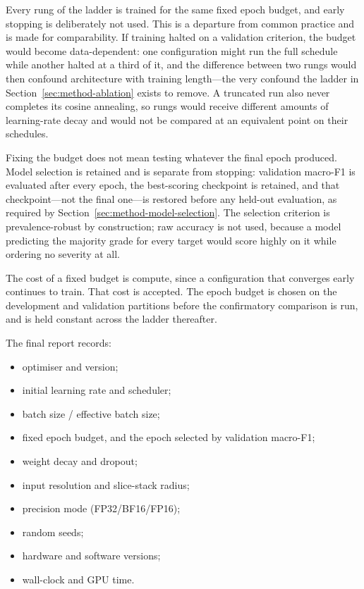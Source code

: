 Every rung of the ladder is trained for the same fixed epoch budget, and early
stopping is deliberately not used. This is a departure from common practice and
is made for comparability. If training halted on a validation criterion, the
budget would become data-dependent: one configuration might run the full
schedule while another halted at a third of it, and the difference between two
rungs would then confound architecture with training length---the very
confound the ladder in Section~\ref{sec:method-ablation} exists to remove. A
truncated run also never completes its cosine annealing, so rungs would receive
different amounts of learning-rate decay and would not be compared at an
equivalent point on their schedules.

Fixing the budget does not mean testing whatever the final epoch produced.
Model selection is retained and is separate from stopping: validation macro-F1
is evaluated after every epoch, the best-scoring checkpoint is retained, and
that checkpoint---not the final one---is restored before any held-out
evaluation, as required by Section~\ref{sec:method-model-selection}. The
selection criterion is prevalence-robust by construction; raw accuracy is not
used, because a model predicting the majority grade for every target would
score highly on it while ordering no severity at all.

The cost of a fixed budget is compute, since a configuration that converges
early continues to train. That cost is accepted. The epoch budget is chosen on
the development and validation partitions before the confirmatory comparison is
run, and is held constant across the ladder thereafter.

The final report records:

\begin{itemize}
  \item optimiser and version;
  \item initial learning rate and scheduler;
  \item batch size / effective batch size;
  \item fixed epoch budget, and the epoch selected by validation macro-F1;
  \item weight decay and dropout;
  \item input resolution and slice-stack radius;
  \item precision mode (FP32/BF16/FP16);
  \item random seeds;
  \item hardware and software versions;
  \item wall-clock and GPU time.
\end{itemize}


